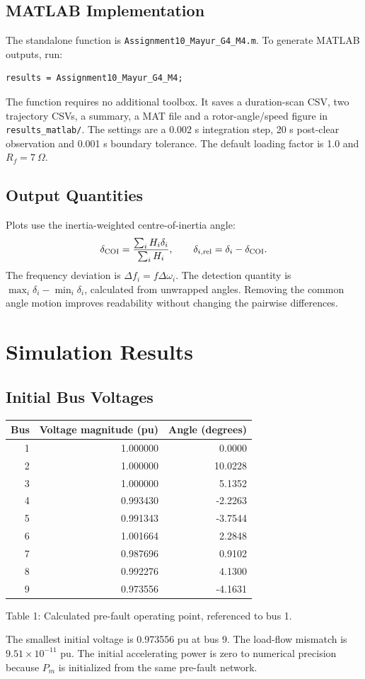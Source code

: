 \documentclass[11pt,a4paper]{article}
\newcommand{\captext}[1]{\begin{center}\small #1\end{center}}
\begin{document}
\subsection{MATLAB Implementation}
The standalone function is \texttt{Assignment10\_Mayur\_G4\_M4.m}. To generate MATLAB outputs, run:
\begin{verbatim}
results = Assignment10_Mayur_G4_M4;
\end{verbatim}
The function requires no additional toolbox. It saves a duration-scan CSV, two trajectory CSVs, a summary, a MAT file and a rotor-angle/speed figure in \texttt{results\_matlab/}. The settings are a 0.002 s integration step, 20 s post-clear observation and 0.001 s boundary tolerance. The default loading factor is 1.0 and $R_f=7\ \Omega$.
\subsection{Output Quantities}
Plots use the inertia-weighted centre-of-inertia angle:
\[\delta_{\rm COI}=\frac{\sum_iH_i\delta_i}{\sum_iH_i},\qquad
\delta_{i,\rm rel}=\delta_i-\delta_{\rm COI}.\]
The frequency deviation is $\Delta f_i=f\Delta\omega_i$. The detection quantity is $\max_i\delta_i-\min_i\delta_i$, calculated from unwrapped angles. Removing the common angle motion improves readability without changing the pairwise differences.
\newpage
\section{Simulation Results}
\subsection{Initial Bus Voltages}
\begin{center}\begin{tabular}{rrr}\toprule Bus&Voltage magnitude (pu)&Angle (degrees)\\\midrule
1 & 1.000000 & 0.0000 \\
2 & 1.000000 & 10.0228 \\
3 & 1.000000 & 5.1352 \\
4 & 0.993430 & -2.2263 \\
5 & 0.991343 & -3.7544 \\
6 & 1.001664 & 2.2848 \\
7 & 0.987696 & 0.9102 \\
8 & 0.992276 & 4.1300 \\
9 & 0.973556 & -4.1631 \\
\bottomrule\end{tabular}\end{center}
\captext{Table 1: Calculated pre-fault operating point, referenced to bus 1.}
The smallest initial voltage is 0.973556 pu at bus 9. The load-flow mismatch is $9.51\times10^{-11}$ pu. The initial accelerating power is zero to numerical precision because $P_m$ is initialized from the same pre-fault network.
\end{document}
